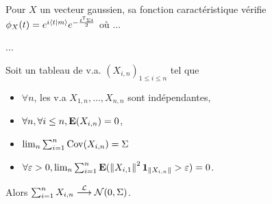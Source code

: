 	Pour $X$ un vecteur gaussien, sa fonction caractéristique vérifie $\phi_X(t) = e^{i\left\langle t \mid m \right\rangle} e^{-\frac{t^\mathsf{T} \Sigma t}{2}}$ où ...
	
	\begin{thm}
		...
	\end{thm}

	\begin{thm}[de Linderbergh]
		Soit un tableau de v.a. $(X_{i,n})_{1 \leq i \leq n}$ tel que
		\begin{itemize}
			\item[\textbullet] $\forall n$, les v.a $X_{1,n},\ldots,X_{n,n}$ sont indépendantes,
			\item[\textbullet] $\forall n, \forall i \leq n, \mathbf{E}(X_{i,n}) = 0$,
			\item[\textbullet] $\lim_n \sum_{i = 1}^n \operatorname{Cov}(X_{i,n}) = \Sigma$
			\item[\textbullet] $\forall \varepsilon > 0, \lim_n \sum_{i = 1}^n \mathbf{E}(\left\lVert X_{i,1}\right\rVert^2 \operatorname{\mathbf{1}}_{\left\lVert X_{i,n}\right\rVert} > \varepsilon) = 0$.
		\end{itemize}
		Alors $\sum_{i = 1}^n X_{i,n} \overset{\mathcal{L}}{\longrightarrow} \mathcal{N}(0,\Sigma)$.
	\end{thm}
